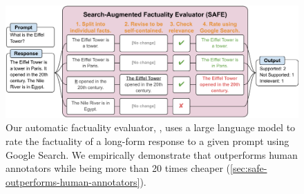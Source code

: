 \begin{figure}[ht]
    \centering
    \includegraphics[width=\linewidth]{figures/imported_figures/safe-overview.pdf}
    \caption{
        Our automatic factuality evaluator, \safe{}, uses a large language model to rate the factuality of a long-form response to a given prompt using Google Search.
        We empirically demonstrate that \safe{} outperforms human annotators while being more than 20 times cheaper (\cref{sec:safe-outperforms-human-annotators}).
    }
    \label{fig:safe-overview}
\end{figure}